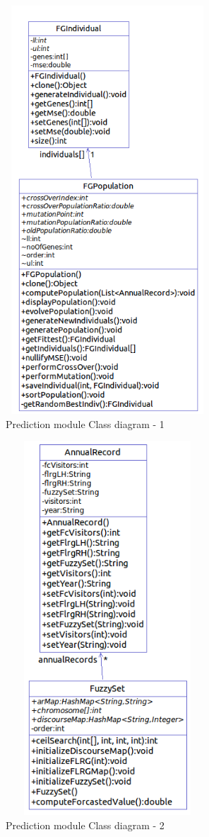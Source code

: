 \documentclass[12pt,journal,compsoc]{IEEEtran}
\begin{document}
\begin{figure}
\includegraphics[height=6in,width=3in]{gafts_class_1}
\caption{Prediction module Class diagram - 1}
\label{gafts_class_1}
\end{figure}
\begin{figure}
\includegraphics[height=5.5in,width=3in]{gafts_class_2}
\caption{Prediction module Class diagram - 2}
\label{gafts_class_2}
\end{figure}
\end{document}
